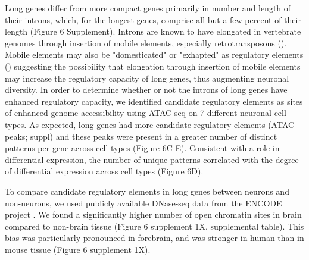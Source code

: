 Long genes differ from more compact genes primarily in number and length of their introns, which, for the longest genes, comprise all but a few percent of their length (Figure 6 Supplement). Introns are known to have elongated in vertebrate genomes through insertion of mobile elements, especially retrotransposons (). Mobile elements may also be "domesticated" or "exhapted" as regulatory elements () suggesting the possibility that elongation through insertion of mobile elements may increase the regulatory capacity of long genes, thus augmenting neuronal diversity. In order to determine whether or not the introns of long genes have enhanced regulatory capacity, we identified candidate regulatory elements as sites of enhanced genome accessibility using ATAC-seq \cite{Buenrostro_2013} on 7 different neuronal cell types. As expected, long genes had more candidate regulatory elements (ATAC peaks; suppl) and these peaks were present in a greater number of distinct patterns per gene across cell types (Figure 6C-E). Consistent with a role in differential expression, the number of unique patterns correlated with the degree of differential expression across cell types (Figure 6D).

To compare candidate regulatory elements in long genes between neurons and non-neurons, we used publicly available DNase-seq data from the ENCODE project \cite{Dunham_2012}. We found a significantly higher number of open chromatin sites in brain compared to non-brain tissue (Figure 6 supplement 1X, supplemental table). This bias was  particularly pronounced in forebrain, and was stronger in human than in mouse tissue (Figure 6 supplement 1X).